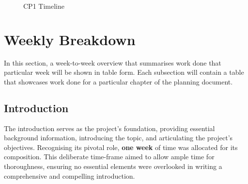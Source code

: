 \documentclass[a4paper, 12pt]{extreport}
\begin{document}
		\begin{landscape}
			\begin{figure}
				\centering
				\begin{ganttchart}[x unit=1cm, vgrid=dotted, hgrid = true]{1}{15}
					\\
					\\
					\\
					\\
					\\
					\\
					\\
					\\
					\\
					\\
				\end{ganttchart}
				\caption{CP1 Timeline}
			\end{figure}
		\end{landscape}
		
		\section{Weekly Breakdown}
		
			In this section, a week-to-week overview that summarises work done that particular week will be shown in table form. Each subsection will contain a table that showcases work done for a particular chapter of the planning document. 
		
		\subsection{Introduction}
		\label{sec:intro}
		
			The introduction serves as the project's foundation, providing essential background information, introducing the topic, and articulating the project's objectives. Recognising its pivotal role, \textbf{one week} of time was allocated for its composition. This deliberate time-frame aimed to allow ample time for thoroughness, ensuring no essential elements were overlooked in writing a comprehensive and compelling introduction.
			
\end{document}
